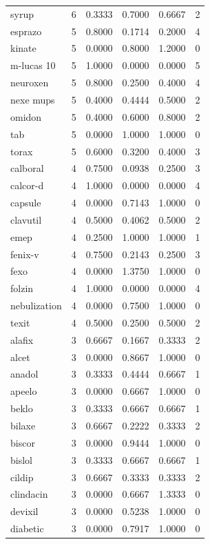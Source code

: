 \begin{longtable}{p{3.0cm}rrrrr}
syrup & 6 & 0.3333 & 0.7000 & 0.6667 & 2 \\
esprazo & 5 & 0.8000 & 0.1714 & 0.2000 & 4 \\
kinate & 5 & 0.0000 & 0.8000 & 1.2000 & 0 \\
m-lucas 10 & 5 & 1.0000 & 0.0000 & 0.0000 & 5 \\
neuroxen & 5 & 0.8000 & 0.2500 & 0.4000 & 4 \\
nexe mups & 5 & 0.4000 & 0.4444 & 0.5000 & 2 \\
omidon & 5 & 0.4000 & 0.6000 & 0.8000 & 2 \\
tab & 5 & 0.0000 & 1.0000 & 1.0000 & 0 \\
torax & 5 & 0.6000 & 0.3200 & 0.4000 & 3 \\
calboral & 4 & 0.7500 & 0.0938 & 0.2500 & 3 \\
calcor-d & 4 & 1.0000 & 0.0000 & 0.0000 & 4 \\
capsule & 4 & 0.0000 & 0.7143 & 1.0000 & 0 \\
clavutil & 4 & 0.5000 & 0.4062 & 0.5000 & 2 \\
emep & 4 & 0.2500 & 1.0000 & 1.0000 & 1 \\
fenix-v & 4 & 0.7500 & 0.2143 & 0.2500 & 3 \\
fexo & 4 & 0.0000 & 1.3750 & 1.0000 & 0 \\
folzin & 4 & 1.0000 & 0.0000 & 0.0000 & 4 \\
nebulization & 4 & 0.0000 & 0.7500 & 1.0000 & 0 \\
texit & 4 & 0.5000 & 0.2500 & 0.5000 & 2 \\
alafix & 3 & 0.6667 & 0.1667 & 0.3333 & 2 \\
alcet & 3 & 0.0000 & 0.8667 & 1.0000 & 0 \\
anadol & 3 & 0.3333 & 0.4444 & 0.6667 & 1 \\
apeelo & 3 & 0.0000 & 0.6667 & 1.0000 & 0 \\
beklo & 3 & 0.3333 & 0.6667 & 0.6667 & 1 \\
bilaxe & 3 & 0.6667 & 0.2222 & 0.3333 & 2 \\
biscor & 3 & 0.0000 & 0.9444 & 1.0000 & 0 \\
bislol & 3 & 0.3333 & 0.6667 & 0.6667 & 1 \\
cildip & 3 & 0.6667 & 0.3333 & 0.3333 & 2 \\
clindacin & 3 & 0.0000 & 0.6667 & 1.3333 & 0 \\
devixil & 3 & 0.0000 & 0.5238 & 1.0000 & 0 \\
diabetic & 3 & 0.0000 & 0.7917 & 1.0000 & 0 \\

\end{longtable}
